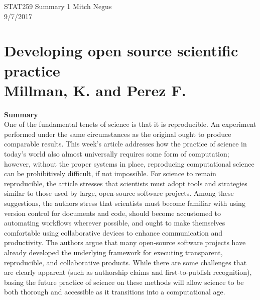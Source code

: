 \documentclass{report}
\newcommand{\tab}{\-\hspace{1cm}}
\begin{document}
\thispagestyle{empty}
\sffamily

\large {STAT259 Summary {1} \hfill Mitch Negus\\
		\hspace*{\fill} 9/7/2017\\ }
\section*{\textsf{Developing open source scientific practice \\ \normalsize Millman, K. and Perez F.}}

\textbf{Summary}\\
\tab One of the fundamental tenets of science is that it is reproducible. An experiment performed under the same circumstances as the original ought to produce comparable results. This week's article addresses how the practice of science in today's world also almost universally requires some form of computation; however, without the proper systems in place, reproducing computational science can be prohibitively difficult, if not impossible. For science to remain reproducible, the article stresses that scientists must adopt tools and strategies similar to those used by large, open-source software projects. Among these suggestions, the authors stress that scientists must become familiar with using version control for documents and code, should become accustomed to automating workflows wherever possible, and ought to make themselves comfortable using collaborative devices to enhance communication and productivity. The authors argue that many open-source software projects have already developed the underlying framework for executing transparent, reproducible, and collaborative products. While there are some challenges that are clearly apparent (such as authorship claims and first-to-publish recognition), basing the future practice of science on these methods will allow science to be both thorough and accessible as it transitions into a computational age.
\end{document}
